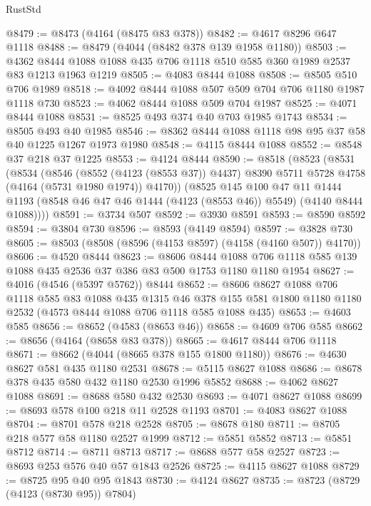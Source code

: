 \begin{lexlean}{RustStd}
\begin{coremodule}
@8479 := @8473 (@4164 (@8475 @83 @378))
@8482 := @4617 @8296 @647 @1118
@8488 := @8479 (@4044 (@8482 @378 @139 @1958 @1180))
@8503 := @4362 @8444 @1088 @1088 @435 @706 @1118 @510 @585 @360 @1989 @2537 @83 @1213 @1963 @1219
@8505 := @4083 @8444 @1088
@8508 := @8505 @510 @706 @1989
@8518 := @4092 @8444 @1088 @507 @509 @704 @706 @1180 @1987 @1118 @730
@8523 := @4062 @8444 @1088 @509 @704 @1987
@8525 := @4071 @8444 @1088
@8531 := @8525 @493 @374 @40 @703 @1985 @1743
@8534 := @8505 @493 @40 @1985
@8546 := @8362 @8444 @1088 @1118 @98 @95 @37 @58 @40 @1225 @1267 @1973 @1980
@8548 := @4115 @8444 @1088
@8552 := @8548 @37 @218 @37 @1225
@8553 := @4124 @8444
@8590 := @8518
    (@8523
      (@8531
        (@8534
          (@8546
            (@8552 (@4123 (@8553 @37)) @4437)
            @8390
            @5711
            @5728
            @4758
            (@4164 (@5731 @1980 @1974))
            @4170))
        (@8525
          @145
          @100
          @47
          @11
          @1444
          @1193
          (@8548 @46 @47 @46 @1444 (@4123 (@8553 @46)) @5549)
          (@4140 @8444 @1088))))
@8591 := @3734 @507
@8592 := @3930 @8591
@8593 := @8590 @8592
@8594 := @3804 @730
@8596 := @8593 (@4149 @8594)
@8597 := @3828 @730
@8605 := @8503 (@8508 (@8596 (@4153 @8597) (@4158 (@4160 @507)) @4170))
@8606 := @4520 @8444
@8623 := @8606
    @8444
    @1088
    @706
    @1118
    @585
    @139
    @1088
    @435
    @2536
    @37
    @386
    @83
    @500
    @1753
    @1180
    @1180
    @1954
@8627 := @4016 (@4546 (@5397 @5762)) @8444
@8652 := @8606
    @8627
    @1088
    @706
    @1118
    @585
    @83
    @1088
    @435
    @1315
    @46
    @378
    @155
    @581
    @1800
    @1180
    @1180
    @2532
    (@4573 @8444 @1088 @706 @1118 @585 @1088 @435)
@8653 := @4603 @585
@8656 := @8652 (@4583 (@8653 @46))
@8658 := @4609 @706 @585
@8662 := @8656 (@4164 (@8658 @83 @378))
@8665 := @4617 @8444 @706 @1118
@8671 := @8662 (@4044 (@8665 @378 @155 @1800 @1180))
@8676 := @4630 @8627 @581 @435 @1180 @2531
@8678 := @5115 @8627 @1088
@8686 := @8678 @378 @435 @580 @432 @1180 @2530 @1996 @5852
@8688 := @4062 @8627 @1088
@8691 := @8688 @580 @432 @2530
@8693 := @4071 @8627 @1088
@8699 := @8693 @578 @100 @218 @11 @2528 @1193
@8701 := @4083 @8627 @1088
@8704 := @8701 @578 @218 @2528
@8705 := @8678 @180
@8711 := @8705 @218 @577 @58 @1180 @2527 @1999
@8712 := @5851 @5852
@8713 := @5851 @8712
@8714 := @8711 @8713
@8717 := @8688 @577 @58 @2527
@8723 := @8693 @253 @576 @40 @57 @1843 @2526
@8725 := @4115 @8627 @1088
@8729 := @8725 @95 @40 @95 @1843
@8730 := @4124 @8627
@8735 := @8723 (@8729 (@4123 (@8730 @95)) @7804)

\end{coremodule}
\end{lexlean}
